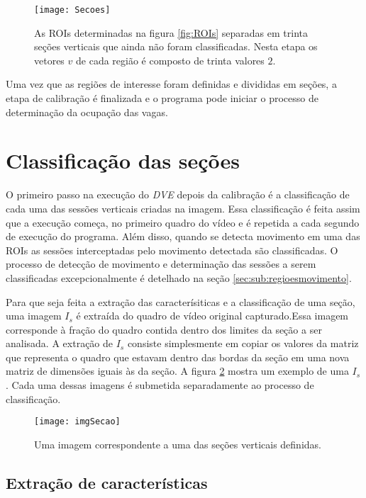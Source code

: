 \begin{figure}
	\centering
	\texttt{[image: Secoes]}
	\label{fig:secoesVerticais}
	\caption{As ROIs determinadas na figura \ref{fig:ROIs} separadas em trinta seções verticais que ainda não foram classificadas. Nesta etapa os vetores $v$ de cada região é composto de trinta valores $2$.}
	\centering
\end{figure}


Uma vez que as regiões de interesse foram definidas e divididas em seções, a etapa de calibração é finalizada e o programa pode iniciar o processo de determinação da ocupação das vagas. 

\section{Classificação das seções} \label{sec:classificacao}

O primeiro passo na execução do \textit{DVE} depois da calibração é a classificação de cada uma das sessões verticais criadas na imagem. Essa classificação é feita assim que a execução começa, no primeiro quadro do vídeo e é repetida a cada segundo de execução do programa. Além disso, quando se detecta movimento em uma das ROIs as sessões interceptadas pelo movimento detectada são classificadas. O processo de detecção de movimento e determinação das sessões a serem classificadas excepcionalmente é detelhado na seção \ref{sec:sub:regioesmovimento}.

Para que seja feita a extração das caracterísiticas e a classificação de uma seção, uma imagem $I_s$ é extraída do quadro de vídeo original capturado.Essa imagem corresponde à fração do quadro contida dentro dos limites da seção a ser analisada. A extração de $I_s$ consiste simplesmente em copiar os valores da matriz que representa o quadro que estavam dentro das bordas da seção em uma nova matriz de dimensões iguais às da seção. A figura \ref{fig:imgSecao} mostra um exemplo de uma $I_s$. Cada uma dessas imagens é submetida separadamente ao processo de classificação.

\begin{figure}
	\centering
	\texttt{[image: imgSecao]}
	\label{fig:imgSecao}
	\caption{Uma imagem correspondente a uma das seções verticais definidas.}
	\centering
\end{figure}


\subsection{Extração de características}\label{sec:extracao}

